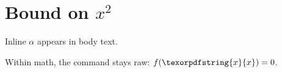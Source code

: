 \section{Bound on \texorpdfstring{$x^2$}{x squared}}

Inline \texorpdfstring{$\alpha$}{alpha} appears in body text.

Within math, the command stays raw: $f(\texorpdfstring{x}{x}) = 0$.
